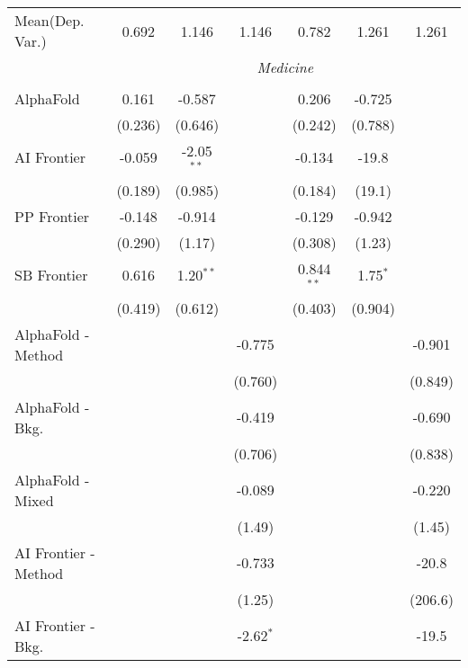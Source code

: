 \begin{tabular}{lcccccc}
Mean(Dep. Var.) & 0.692 & 1.146 & 1.146 & 0.782 & 1.261 & 1.261 \\
 & \multicolumn{6}{c}{\textit{Medicine}} \\ \\
   AlphaFold            & 0.161   & -0.587       &             & 0.206        & -0.725     &   \\   
                        & (0.236) & (0.646)      &             & (0.242)      & (0.788)    &   \\   
   AI Frontier          & -0.059  & -2.05$^{**}$ &             & -0.134       & -19.8      &   \\   
                        & (0.189) & (0.985)      &             & (0.184)      & (19.1)     &   \\   
   PP Frontier          & -0.148  & -0.914       &             & -0.129       & -0.942     &   \\   
                        & (0.290) & (1.17)       &             & (0.308)      & (1.23)     &   \\   
   SB Frontier          & 0.616   & 1.20$^{**}$  &             & 0.844$^{**}$ & 1.75$^{*}$ &   \\   
                        & (0.419) & (0.612)      &             & (0.403)      & (0.904)    &   \\   
   AlphaFold - Method   &         &              & -0.775      &              &            & -0.901\\   
                        &         &              & (0.760)     &              &            & (0.849)\\   
   AlphaFold - Bkg.     &         &              & -0.419      &              &            & -0.690\\   
                        &         &              & (0.706)     &              &            & (0.838)\\   
   AlphaFold - Mixed    &         &              & -0.089      &              &            & -0.220\\   
                        &         &              & (1.49)      &              &            & (1.45)\\   
   AI Frontier - Method &         &              & -0.733      &              &            & -20.8\\   
                        &         &              & (1.25)      &              &            & (206.6)\\   
   AI Frontier - Bkg.   &         &              & -2.62$^{*}$ &              &            & -19.5\\   

\end{tabular}
